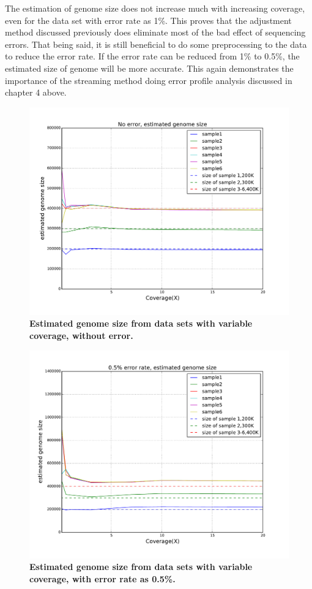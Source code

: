 \documentclass{article}
\begin{document}
The estimation of genome size does not increase much with increasing coverage, 
even for the data set with error rate as 1\%. This proves that the adjustment method discussed
previously does eliminate most of the bad effect of sequencing errors. 
That being said, it is still beneficial to do some preprocessing to the data
to reduce the error rate. If the error rate can be reduced from 1\% to 0.5\%, the 
estimated size of genome will be more accurate. This again demonstrates the importance of
the streaming method doing error profile analysis discussed in chapter 4 above.

\begin{figure}[!ht]
 \centerline{\includegraphics[width=6in]{./figures/alpha_by_coverage_0e.pdf}}
\caption{\bf Estimated genome size from data sets with variable coverage,
without error.}
\label{fig:alpha_by_coverage_0e}
\end{figure}

\begin{figure}[!ht]
 \centerline{\includegraphics[width=6in]{./figures/alpha_by_coverage_0005e.pdf}}
\caption{\bf Estimated genome size from data sets with variable coverage, with
error rate as 0.5\%.}
\label{fig:alpha_by_coverage_0005e}
\end{figure}
\end{document}
